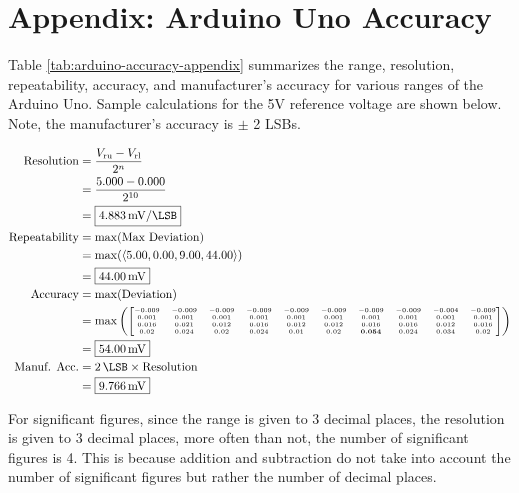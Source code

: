 \section{Appendix: Arduino Uno Accuracy}
\label{sec:appendix-arduino-accuracy}
Table \ref{tab:arduino-accuracy-appendix} summarizes the range, resolution, repeatability, accuracy, and manufacturer's accuracy for various ranges of the 
Arduino Uno. Sample calculations for the 5V reference voltage are shown below. Note, the manufacturer's accuracy is $\pm$ 2 LSBs.

\begin{align*}
    \text{Resolution} &= \frac{V_{\text{ru}} - V_{\text{rl}}}{2^n} \\
    &= \frac{5.000 - 0.000}{2^{10}} \\
    &= \boxed{\qty[per-mode=symbol]{4.883}{\milli\volt\per\LSB}} \\
    \text{Repeatability} &= \max({\text{Max Deviation}}) \\
    &= \max(\langle 5.00, 0.00, 9.00, 44.00 \rangle) \\
    &= \boxed{\qty{44.00}{\milli\volt}} \\
    \text{Accuracy} &= \max({\text{Deviation}}) \\
    &= \max\left(
        \tiny	
        \begin{bmatrix}
            -0.009 & -0.009 & -0.009 & -0.009 & -0.009 & -0.009 & -0.009 & -0.009 & -0.004 & -0.009 \\
            0.001 & 0.001 & 0.001 & 0.001 & 0.001 & 0.001 & 0.001 & 0.001 & 0.001 & 0.001 \\
            0.016 & 0.021 & 0.012 & 0.016 & 0.012 & 0.012 & 0.016 & 0.016 & 0.012 & 0.016 \\
            0.02 & 0.024 & 0.02 & 0.024 & 0.01 & 0.02 & \textbf{0.054} & 0.024 & 0.034 & 0.02 \\
        \end{bmatrix}
    \right) \nonumber \\
    &= \boxed{\qty{54.00}{\milli\volt}}\\
    \text{Manuf. Acc.} &= \qty{2}{\LSB} \times \text{Resolution} \\
    &= \boxed{\qty{9.766}{\milli\volt}}
\end{align*}

\noindent For significant figures, since the range is given to 3 decimal places, the resolution is given to 3 decimal places, more often
than not, the number of significant figures is 4. This is because addition and subtraction do not take into account the number of significant figures
but rather the number of decimal places.

